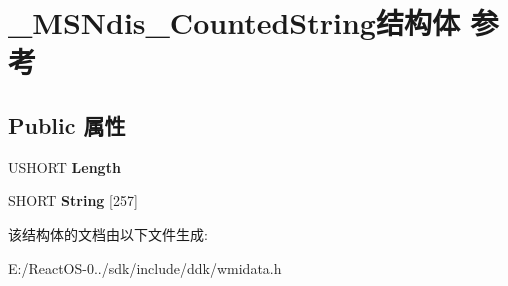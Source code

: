 \hypertarget{struct___m_s_ndis___counted_string}{}\section{\+\_\+\+M\+S\+Ndis\+\_\+\+Counted\+String结构体 参考}
\label{struct___m_s_ndis___counted_string}
\subsection*{Public 属性}
\begin{DoxyCompactItemize}
\item 
\mbox{\label{struct___m_s_ndis___counted_string_a38b90f00560ccd48d7f21b11221778c1}} 
U\+S\+H\+O\+RT {\bfseries Length}
\item 
\mbox{\label{struct___m_s_ndis___counted_string_aac09acc305bdf12cd747de3c6a91f700}} 
S\+H\+O\+RT {\bfseries String} \mbox{[}257\mbox{]}
\end{DoxyCompactItemize}


该结构体的文档由以下文件生成\+:\begin{DoxyCompactItemize}
\item 
E\+:/\+React\+O\+S-\/0../sdk/include/ddk/wmidata.\+h\end{DoxyCompactItemize}
